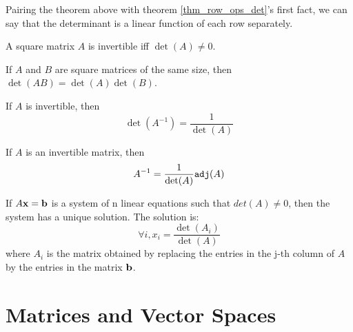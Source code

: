 \documentclass{report}
\begin{document}
			Pairing the theorem above with theorem \ref{thm_row_ops_det}'s first fact, we can say that the determinant is a linear function of each row separately.
			
			\begin{thm}
				A square matrix $A$ is invertible iff $\det(A) \ne 0$.
			\end{thm}
			
			\begin{thm}
				If $A$ and $B$ are square matrices of the same size, then $\det(AB)=\det(A)\det(B)$.
			\end{thm}
			
			\begin{thm}
				If $A$ is invertible, then
				\begin{displaymath}
					\det(A^{-1})=\frac{1}{\det(A)}
				\end{displaymath}
			\end{thm}
			
			\begin{thm}
				If $A$ is an invertible matrix, then
				\begin{displaymath}
					A^{-1}=\frac{1}{\det(A)}\verb|adj|(A)
				\end{displaymath}
			\end{thm}
			
			\begin{thm}
				If $A\bf{x}=\bf{b}$ is a system of n linear equations such that $det(A)\ne0$, then the system has a unique solution. The solution is:
				\begin{displaymath}
					\forall i, x_i=\frac{\det(A_i)}{\det(A)}
				\end{displaymath}
				where $A_i$ is the matrix obtained by replacing the entries in the j-th column of $A$ by the entries in the matrix $\bf{b}$.
			\end{thm}
		
	\section{Matrices and Vector Spaces}
\end{document}
